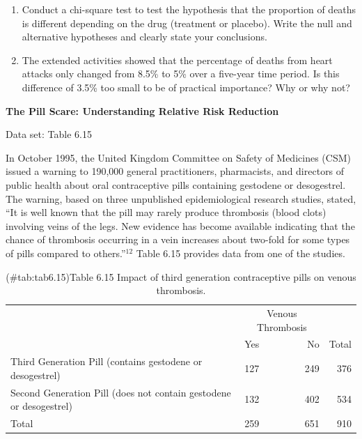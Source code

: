 \documentclass[
]{report}
\begin{document}
\begin{list}{E.}{ \setlength{\itemsep}{0.5em}}
  \begin{enumerate}
    \item Conduct a chi-square test to test the hypothesis that the proportion of deaths is different depending on the drug (treatment or placebo). Write the null and alternative hypotheses and clearly state your conclusions.
    \item The extended activities showed that the percentage of deaths from heart attacks only changed from 8.5\% to 5\% over a five-year time period. Is this difference of 3.5\% too small to be of practical importance? Why or why not?
  \end{enumerate}

  \item \textbf{The Pill Scare: Understanding Relative Risk Reduction}    

  Data set: Table 6.15 
  
  In October 1995, the United Kingdom Committee on Safety of Medicines (CSM) issued a warning to 190,000 general practitioners, pharmacists, and directors of public health about oral contraceptive pills containing gestodene or desogestrel. The warning, based on three unpublished epidemiological research studies, stated, “It is well known that the pill may rarely produce thrombosis (blood clots) involving veins of the legs. New evidence has become available indicating that the chance of thrombosis occurring in a vein increases about two-fold for some types of pills compared to others.”$^{12}$ Table 6.15 provides data from one of the studies.  

\begin{table}[!h]
\centering
\caption{(\#tab:tab6.15)Table 6.15 Impact of third generation contraceptive pills on venous thrombosis.}
\centering
\begin{tabular}[t]{>{\raggedright\arraybackslash}p{6cm}lrr}
\toprule
\multicolumn{1}{c}{ } & \multicolumn{2}{c}{Venous Thrombosis} & \multicolumn{1}{c}{ } \\
\cmidrule(l{3pt}r{3pt}){2-3}
  & Yes & No & Total\\
\midrule
Third Generation Pill
(contains gestodene or desogestrel) & 127 & 249 & 376\\
Second Generation Pill
(does not contain gestodene or desogestrel) & 132 & 402 & 534\\
Total & 259 & 651 & 910\\
\bottomrule
\end{tabular}
\end{table}


\end{list}
\end{document}
